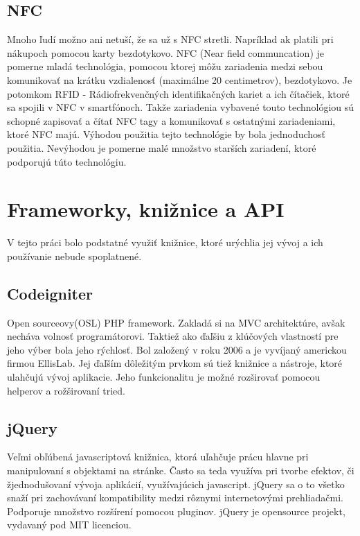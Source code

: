\subsection{NFC} Mnoho ľudí možno ani netuší, že sa už s NFC stretli. Napríklad ak platili pri nákupoch pomocou karty bezdotykovo. NFC (Near field communcation) je pomerne mladá technológia, pomocou ktorej môžu zariadenia medzi sebou komunikovať na krátku vzdialenosť (maximálne 20 centimetrov), bezdotykovo. Je potomkom RFID - Rádiofrekvenčných identifikačných kariet a ich čítačiek, ktoré sa spojili v NFC v smartfónoch. Takže zariadenia vybavené touto technológiou sú schopné zapisovať a čítať NFC tagy a komunikovať s ostatnými zariadeniami, ktoré NFC majú. Výhodou použitia tejto technológie by bola jednoduchosť použitia. Nevýhodou je pomerne malé množstvo starších zariadení, ktoré podporujú túto technológiu.

\section{Frameworky, knižnice a API}
V tejto práci bolo podstatné využiť knižnice, ktoré urýchlia jej vývoj a ich používanie nebude spoplatnené.

\subsection{Codeigniter} Open sourceovy(OSL) PHP framework. Zakladá si na MVC architektúre, avšak necháva volnosť programátorovi. Taktiež ako ďaľšiu z klúčových vlastností pre jeho výber bola jeho rýchlosť\cite{codeigniter-guide}. Bol založený v roku 2006 a je vyvíjaný americkou firmou EllisLab. Jej ďaľším dôležitým prvkom sú tiež knižnice a nástroje, ktoré ulahčujú vývoj aplikacie. Jeho funkcionalitu je možné rozširovať pomocou helperov a rožširovaní tried.

\subsection{jQuery} Veľmi obľúbená\cite{jquery-usage} javascriptová knižnica, ktorá uľahčuje prácu hlavne pri manipulovaní s objektami na stránke. Často sa teda využíva pri tvorbe efektov, či žjednodušovaní vývoja aplikácií, využívajúcich javascript. jQuery sa o to všetko snaží pri zachovávaní kompatibility medzi rôznymi internetovými prehliadačmi\cite{jquery-browsers}. Podporuje množstvo rozšírení pomocou pluginov\cite{jquery-plugins}. jQuery je opensource projekt, vydavaný pod MIT licenciou. 

